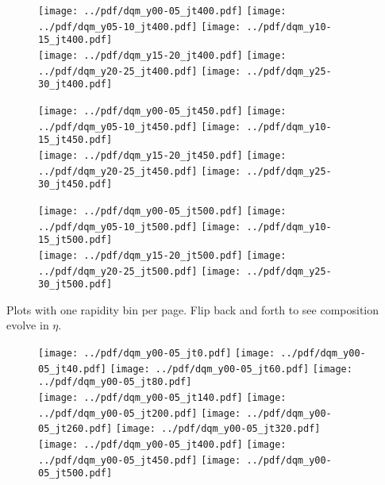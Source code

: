 \documentclass[landscape,10pt]{beamer} %
\begin{document}
\newpage

\begin{figure}[p]
\centering
\texttt{[image: ../pdf/dqm\_y00-05\_jt400.pdf]}
\texttt{[image: ../pdf/dqm\_y05-10\_jt400.pdf]}
\texttt{[image: ../pdf/dqm\_y10-15\_jt400.pdf]}\\
\texttt{[image: ../pdf/dqm\_y15-20\_jt400.pdf]}
\texttt{[image: ../pdf/dqm\_y20-25\_jt400.pdf]}
\texttt{[image: ../pdf/dqm\_y25-30\_jt400.pdf]}
\end{figure}

\newpage

\begin{figure}[p]
\centering
\texttt{[image: ../pdf/dqm\_y00-05\_jt450.pdf]}
\texttt{[image: ../pdf/dqm\_y05-10\_jt450.pdf]}
\texttt{[image: ../pdf/dqm\_y10-15\_jt450.pdf]}\\
\texttt{[image: ../pdf/dqm\_y15-20\_jt450.pdf]}
\texttt{[image: ../pdf/dqm\_y20-25\_jt450.pdf]}
\texttt{[image: ../pdf/dqm\_y25-30\_jt450.pdf]}
\end{figure}

\newpage

\begin{figure}[p]
\centering
\texttt{[image: ../pdf/dqm\_y00-05\_jt500.pdf]}
\texttt{[image: ../pdf/dqm\_y05-10\_jt500.pdf]}
\texttt{[image: ../pdf/dqm\_y10-15\_jt500.pdf]}\\
\texttt{[image: ../pdf/dqm\_y15-20\_jt500.pdf]}
\texttt{[image: ../pdf/dqm\_y20-25\_jt500.pdf]}
\texttt{[image: ../pdf/dqm\_y25-30\_jt500.pdf]}
\end{figure}


\newpage

Plots with one rapidity bin per page. Flip back and forth to see composition evolve in $\eta$.

\newpage

\begin{figure}[p]
\texttt{[image: ../pdf/dqm\_y00-05\_jt0.pdf]}
\texttt{[image: ../pdf/dqm\_y00-05\_jt40.pdf]}
\texttt{[image: ../pdf/dqm\_y00-05\_jt60.pdf]}
\texttt{[image: ../pdf/dqm\_y00-05\_jt80.pdf]}\\
\texttt{[image: ../pdf/dqm\_y00-05\_jt140.pdf]}
\texttt{[image: ../pdf/dqm\_y00-05\_jt200.pdf]}
\texttt{[image: ../pdf/dqm\_y00-05\_jt260.pdf]}
\texttt{[image: ../pdf/dqm\_y00-05\_jt320.pdf]}\\
\texttt{[image: ../pdf/dqm\_y00-05\_jt400.pdf]}
\texttt{[image: ../pdf/dqm\_y00-05\_jt450.pdf]}
\texttt{[image: ../pdf/dqm\_y00-05\_jt500.pdf]}
\end{figure}
\end{document}
